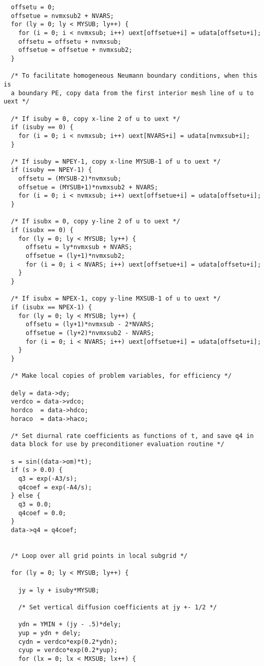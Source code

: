 \begin{verbatim}
  offsetu = 0;
  offsetue = nvmxsub2 + NVARS;
  for (ly = 0; ly < MYSUB; ly++) {
    for (i = 0; i < nvmxsub; i++) uext[offsetue+i] = udata[offsetu+i];
    offsetu = offsetu + nvmxsub;
    offsetue = offsetue + nvmxsub2;
  }

  /* To facilitate homogeneous Neumann boundary conditions, when this is
  a boundary PE, copy data from the first interior mesh line of u to uext */

  /* If isuby = 0, copy x-line 2 of u to uext */
  if (isuby == 0) {
    for (i = 0; i < nvmxsub; i++) uext[NVARS+i] = udata[nvmxsub+i];
  }

  /* If isuby = NPEY-1, copy x-line MYSUB-1 of u to uext */
  if (isuby == NPEY-1) {
    offsetu = (MYSUB-2)*nvmxsub;
    offsetue = (MYSUB+1)*nvmxsub2 + NVARS;
    for (i = 0; i < nvmxsub; i++) uext[offsetue+i] = udata[offsetu+i];
  }

  /* If isubx = 0, copy y-line 2 of u to uext */
  if (isubx == 0) {
    for (ly = 0; ly < MYSUB; ly++) {
      offsetu = ly*nvmxsub + NVARS;
      offsetue = (ly+1)*nvmxsub2;
      for (i = 0; i < NVARS; i++) uext[offsetue+i] = udata[offsetu+i];
    }
  }

  /* If isubx = NPEX-1, copy y-line MXSUB-1 of u to uext */
  if (isubx == NPEX-1) {
    for (ly = 0; ly < MYSUB; ly++) {
      offsetu = (ly+1)*nvmxsub - 2*NVARS;
      offsetue = (ly+2)*nvmxsub2 - NVARS;
      for (i = 0; i < NVARS; i++) uext[offsetue+i] = udata[offsetu+i];
    }
  }

  /* Make local copies of problem variables, for efficiency */

  dely = data->dy;
  verdco = data->vdco;
  hordco  = data->hdco;
  horaco  = data->haco;

  /* Set diurnal rate coefficients as functions of t, and save q4 in 
  data block for use by preconditioner evaluation routine */

  s = sin((data->om)*t);
  if (s > 0.0) {
    q3 = exp(-A3/s);
    q4coef = exp(-A4/s);
  } else {
    q3 = 0.0;
    q4coef = 0.0;
  }
  data->q4 = q4coef;


  /* Loop over all grid points in local subgrid */

  for (ly = 0; ly < MYSUB; ly++) {

    jy = ly + isuby*MYSUB;

    /* Set vertical diffusion coefficients at jy +- 1/2 */

    ydn = YMIN + (jy - .5)*dely;
    yup = ydn + dely;
    cydn = verdco*exp(0.2*ydn);
    cyup = verdco*exp(0.2*yup);
    for (lx = 0; lx < MXSUB; lx++) {


\end{verbatim}
